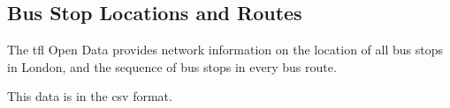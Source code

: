 \subsection{Bus Stop Locations and Routes}
\par The \acrshort{tfl} Open Data provides network information on the location of all bus stops in London, and the sequence of bus stops in every bus route.

\par This data is in the \acrfull{csv} format.

